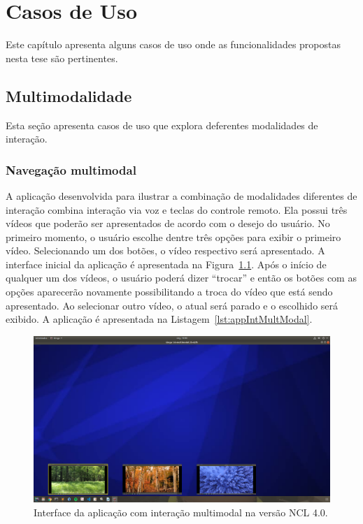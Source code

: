 \chapter{Casos de Uso} \label{cap:cap7}

Este capítulo apresenta alguns casos de uso onde as funcionalidades propostas nesta tese são pertinentes. 

\section{Multimodalidade} \label{sec:casoUsoMultimodalidade}

Esta seção apresenta casos de uso que explora deferentes modalidades de interação.

\subsection{Navegação multimodal}
A aplicação desenvolvida para ilustrar a combinação de modalidades diferentes de interação combina interação via voz e teclas do controle remoto. Ela possui três vídeos que poderão ser apresentados de acordo com o desejo do usuário. No primeiro momento, o usuário escolhe dentre três opções para exibir o primeiro vídeo. Selecionando um dos botões, o vídeo respectivo será apresentado. A interface inicial da aplicação é apresentada na Figura~\ref{fig:appMultmodal}. Após o início de qualquer um dos vídeos, o usuário poderá dizer ``trocar'' e então os botões com as opções aparecerão novamente possibilitando a troca do vídeo que está sendo apresentado. Ao selecionar outro vídeo, o atual será parado e o escolhido será exibido. A aplicação é apresentada na Listagem~\ref{lst:appIntMultModal}.

\begin{figure}[h!] 
\includegraphics[scale=0.2]{figuras/appMultModal.png}
\centering
\caption{Interface da aplicação com interação multimodal na versão NCL 4.0.}
\label{fig:appMultmodal}
\end{figure}
\vspace{-0.2cm}

